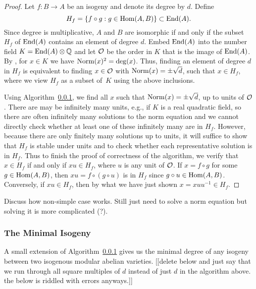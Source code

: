 \documentclass{article}
\begin{document}
\begin{proof}
  Let $f:B \to A$ be an isogeny and denote its degree by $d$. Define
  $$H_f = \{f \circ g: g \in \operatorname{Hom}(A,B)\} \subset \operatorname{End}(A).$$
  Since
  degree is multiplicative, $A$ and $B$ are isomorphic if and only if
  the subset $H_f$ of $\operatorname{End}(A)$ contains an element of degree $d$. Embed $\operatorname{End}(A)$ into the
  number field $K =
  \operatorname{End}(A) \otimes \mathbb{Q}$ and let $\mathcal{O}$ be the order in $K$ that is the image of
  $\operatorname{End}(A)$. By \cite[Prop~12.12]{milne:abvars}, for
  $x \in K$ we have $\operatorname{Norm}(x)^2 = \deg(x)$. Thus, finding an element
  of degree $d$ in $H_f$ is equivalent to finding $x \in \mathcal{O}$ with
  $\operatorname{Norm}(x) = \pm \sqrt{d}$, such that $x \in H_f$, where we view
$H_f$ as a subset of~$K$ using the above inclusions.

Using Algorithm~\ref{}, we find all $x$ such that $\operatorname{Norm}(x) = \pm
\sqrt{d}$, up to units of $\mathcal{O}$.  There are may be infinitely many
units, e.g., if $K$ is a real quadratic field, so there are often
infinitely many solutions to the norm equation and we cannot directly
check whether at least one of these infinitely many are in $H_f$.
However, because there are only finitely many solutions up to units,
it will suffice to show that $H_f$ is stable under units and to check
whether each representative solution is in $H_f$.  Thus to finish
the proof of correctness of the algorithm, we verify that $x\in H_f$ if
and only if $xu \in H_f$, where $u$ is any unit of $\mathcal{O}$.  If $x = f
\circ g$ for some $g \in \operatorname{Hom}(A,B)$, then $xu = f \circ (g \circ u)$
is in $H_f$ since $g \circ u \in \operatorname{Hom}(A,B)$.  Conversely, if $xu\in
H_f$, then by what we have just shown $x = xuu^{-1} \in H_f$.
\end{proof}

Discuss how non-simple case works.  Still just need to solve a norm
equation but solving it is more complicated (?).

\subsubsection{The Minimal Isogeny}

A small extension of Algorithm~\ref{} gives us the minimal degree of any
isogeny between two isogenous modular abelian varieties.
[[delete below and just say that we run through all square multiples
of $d$ instead of just $d$ in the algorithm above.  the below
is riddled with errors anyways.]]
\end{document}
